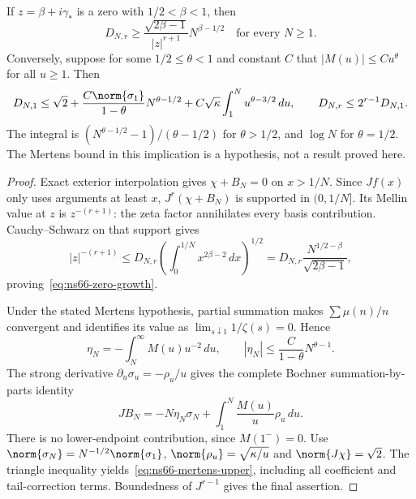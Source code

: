 \begin{proposition}
\label{prop:ns66-growth-bounds}
If $z=\beta+i\gamma_*$ is a zero with $1/2<\beta<1$, then
\begin{equation}
 D_{N,r}\geq\frac{\sqrt{2\beta-1}}{|z|^{r+1}}N^{\beta-1/2}
 \quad\text{for every }N\geq1.
 \label{eq:ns66-zero-growth}
\end{equation}
Conversely, suppose for some $1/2\leq\theta<1$ and constant $C$
that $|M(u)|\leq Cu^\theta$ for all $u\geq1$. Then
\begin{equation}
 D_{N,1}\leq\sqrt2+
  \frac{C\norm{\sigma_1}}{1-\theta}N^{\theta-1/2}
  +C\sqrt\kappa\int_1^N u^{\theta-3/2}\,du,
 \qquad D_{N,r}\leq2^{r-1}D_{N,1}.
 \label{eq:ns66-mertens-upper}
\end{equation}
The integral is $(N^{\theta-1/2}-1)/(\theta-1/2)$ for
$\theta>1/2$, and $\log N$ for $\theta=1/2$.
The Mertens bound in this implication is a hypothesis, not a result
proved here.
\end{proposition}
\begin{proof}
Exact exterior interpolation gives $\chi+B_N=0$ on $x>1/N$.
Since $Jf(x)$ only uses arguments at least $x$, $J^r(\chi+B_N)$
is supported in $(0,1/N]$. Its Mellin value at $z$ is
$z^{-(r+1)}$: the zeta factor annihilates every basis contribution.
Cauchy--Schwarz on that support gives
\[
 |z|^{-(r+1)}\leq D_{N,r}
 \left(\int_0^{1/N}x^{2\beta-2}\,dx\right)^{1/2}
 =D_{N,r}\frac{N^{1/2-\beta}}{\sqrt{2\beta-1}},
\]
proving~\eqref{eq:ns66-zero-growth}.

Under the stated Mertens hypothesis, partial summation makes
$\sum\mu(n)/n$ convergent and identifies its value as
$\lim_{s\downarrow1}1/\zeta(s)=0$. Hence
\[
 \eta_N=-\int_N^\infty M(u)u^{-2}\,du,\qquad
 |\eta_N|\leq\frac{C}{1-\theta}N^{\theta-1}.
\]
The strong derivative $\partial_u\sigma_u=-\rho_u/u$ gives the
complete Bochner summation-by-parts identity
\begin{equation}
 JB_N=-N\eta_N\sigma_N+
           \int_1^N\frac{M(u)}u\rho_u\,du.
 \label{eq:ns66-bochner-abel}
\end{equation}
There is no lower-endpoint contribution, since $M(1^-)=0$.
Use $\norm{\sigma_N}=N^{-1/2}\norm{\sigma_1}$,
$\norm{\rho_u}=\sqrt{\kappa/u}$ and $\norm{J\chi}=\sqrt2$.
The triangle inequality yields~\eqref{eq:ns66-mertens-upper},
including all coefficient and tail-correction terms. Boundedness
of $J^{r-1}$ gives the final assertion.
\end{proof}

